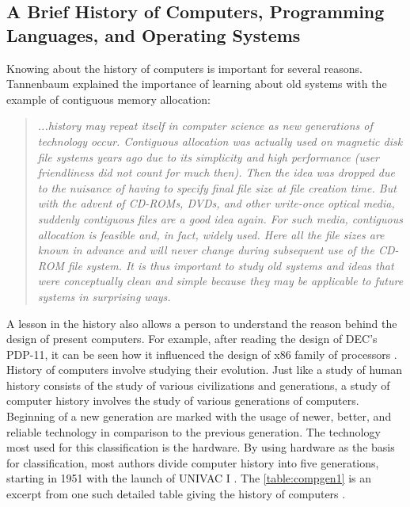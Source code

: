 \subsection{A Brief History of Computers, Programming Languages, and Operating Systems}
Knowing about the history of computers is important for several reasons. Tannenbaum \cite{tannenbaum2003operating} explained the importance of learning about old systems with the example of contiguous memory allocation:
\begin{quotation}
\textit{...history may repeat itself in computer science as new generations of technology occur. Contiguous allocation was actually used on magnetic disk file systems years ago due to its simplicity and high performance (user friendliness did not count for much then). Then the idea was dropped due to the nuisance of having to specify final file size at file creation time. But with the advent of CD-ROMs, DVDs, and other write-once optical media, suddenly contiguous files are a good idea again. For such media, contiguous allocation is feasible and, in fact, widely used. Here all the file sizes are known in advance and will never change during subsequent use of the CD-ROM file system. It is thus important to study old systems and ideas that were conceptually clean and simple because they may be applicable to future systems in surprising ways.}
\end{quotation}
A lesson in the history also allows a person to understand the reason behind the design of present computers. For example, after reading the design of DEC's PDP-11, it can be seen how it influenced the design of x86 family of processors \cite{supnik2004simulators}.\\
History of computers involve studying their evolution. Just like a study of human history consists of the study of various civilizations and generations,  a study of computer history involves the study of various generations of computers. Beginning of a new generation are marked with the usage of newer, better, and reliable technology in comparison to the previous generation. The technology most  used for this classification is the hardware. By using hardware as the basis for classification, most authors divide computer history into five generations, starting in 1951 with the launch of UNIVAC I \citep{ionescu2015categories}. The \autoref{table:compgen1} is an excerpt from one such detailed table giving the history of computers \cite{friedman1992babbage}. 
